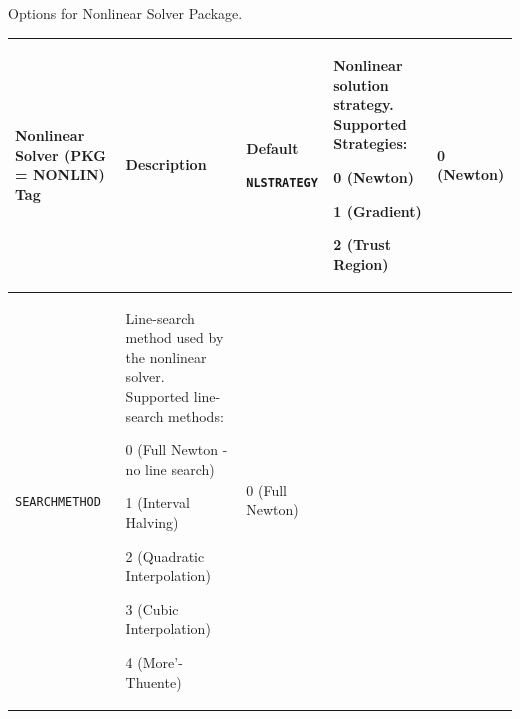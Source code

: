 

\small

\caption[Options for Nonlinear Solver Package.] {Options for Nonlinear Solver Package.\label{NonlinPKG}}
\begin{longtable}[htbp]{|>{\setlength{\hsize}{.8\hsize}}Y|
>{\setlength{\hsize}{1.5\hsize}}Y|
>{\setlength{\hsize}{.7\hsize}}Y|} \hline

\color{white}\textbf{Nonlinear Solver (PKG =
NONLIN) Tag} & \color{white}\bf Description
& \color{white}\bf Default \endhead

\texttt{NLSTRATEGY} & Nonlinear solution strategy.  Supported Strategies:
\begin{XyceItemize}
\item 0 (Newton)
\item 1 (Gradient)
\item 2 (Trust Region)
\end{XyceItemize} &
0 (Newton) \\ \hline

\texttt{SEARCHMETHOD} &
Line-search method used by the nonlinear solver.  Supported
line-search methods:
\begin{XyceItemize}
\item 0 (Full Newton - no line search)
\item 1 (Interval Halving)
\item 2 (Quadratic Interpolation)
\item 3 (Cubic Interpolation)
\item 4 (More'-Thuente)
\end{XyceItemize} &
0 (Full Newton) \\ \hline


\end{longtable}
